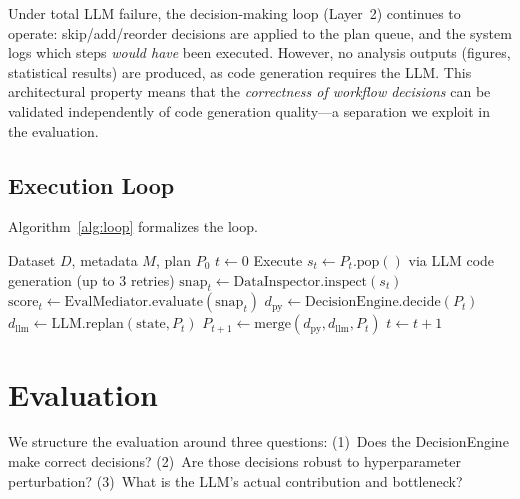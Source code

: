 \documentclass[11pt,a4paper]{article}
\begin{document}
Under total LLM failure, the decision-making loop (Layer~2)
continues to operate: skip/add/reorder decisions are applied to the
plan queue, and the system logs which steps \textit{would have}
been executed.
However, no analysis outputs (figures, statistical results) are
produced, as code generation requires the LLM.
This architectural property means that the \textit{correctness of
workflow decisions} can be validated independently of code
generation quality---a separation we exploit in the evaluation.

\subsection{Execution Loop}

Algorithm~\ref{alg:loop} formalizes the loop.

\begin{algorithm}[t]
\caption{Adaptive Execution Loop}
\label{alg:loop}
\begin{algorithmic}[1]
\REQUIRE Dataset $D$, metadata $M$, plan $P_0$
\STATE $t \gets 0$
  \STATE Execute $s_t \gets P_t.\mathrm{pop}()$ via LLM code generation (up to 3 retries)
  \STATE $\mathrm{snap}_t \gets \mathrm{DataInspector.inspect}(s_t)$
  \STATE $\mathrm{score}_t \gets \mathrm{EvalMediator.evaluate}(\mathrm{snap}_t)$
    \STATE $d_{\mathrm{py}} \gets \mathrm{DecisionEngine.decide}(P_t)$
    \STATE $d_{\mathrm{llm}} \gets \mathrm{LLM.replan}(\mathrm{state}, P_t)$
    \STATE $P_{t+1} \gets \mathrm{merge}(d_{\mathrm{py}}, d_{\mathrm{llm}}, P_t)$
  \ENDIF
  \STATE $t \gets t + 1$
\ENDWHILE
\end{algorithmic}
\end{algorithm}

\section{Evaluation}
\label{sec:eval}

We structure the evaluation around three questions:
(1)~Does the DecisionEngine make correct decisions?
(2)~Are those decisions robust to hyperparameter perturbation?
(3)~What is the LLM's actual contribution and bottleneck?
\end{document}
